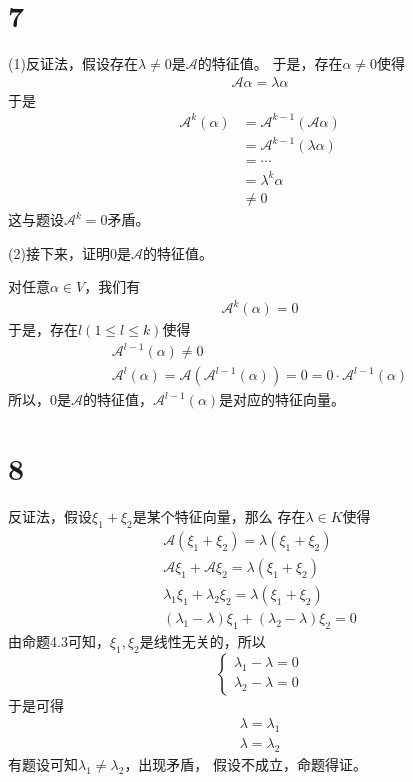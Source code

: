 \documentclass{article}
\begin{document}
\section*{7}

 (1)反证法，假设存在$\lambda \neq 0$是$\mathscr{A}$的特征值。
于是，存在$\alpha \neq 0$使得
\begin{align*}
  \mathscr{A} \alpha = \lambda \alpha
\end{align*}
于是
\begin{align*}
  \mathscr{A}^k (\alpha)
   & = \mathscr{A}^{k-1}(\mathscr{A} \alpha) \\
   & = \mathscr{A}^{k-1}(\lambda \alpha)     \\
   & = \cdots                                \\
   & = \lambda^k \alpha                      \\
   & \neq 0
\end{align*}
这与题设$\mathscr{A}^k = 0$矛盾。

(2)接下来，证明0是$\mathscr{A}$的特征值。

对任意$\alpha \in V$，我们有
\begin{align*}
  \mathscr{A}^k (\alpha) = 0
\end{align*}
于是，存在$l (1 \leq l \leq k)$使得
\begin{align*}
  \mathscr{A}^{l - 1}(\alpha) \neq 0 \\
  \mathscr{A}^l(\alpha) = \mathscr{A}(\mathscr{A}^{l - 1}(\alpha)) = 0 = 0 \cdot \mathscr{A}^{l - 1}(\alpha)
\end{align*}
所以，$0$是$\mathscr{A}$的特征值，$\mathscr{A}^{l - 1}(\alpha)$是对应的特征向量。

\section*{8}

反证法，假设$\xi_1 + \xi_2$是某个特征向量，那么
存在$\lambda \in K$使得
\begin{align*}
  \mathscr{A} (\xi_1 + \xi_2) = \lambda (\xi_1 + \xi_2)           \\
  \mathscr{A} \xi_1 + \mathscr{A} \xi_2 = \lambda (\xi_1 + \xi_2) \\
  \lambda_1 \xi_1 + \lambda_2 \xi_2 = \lambda (\xi_1 + \xi_2)     \\
  (\lambda_1 - \lambda) \xi_1 + (\lambda_2 - \lambda) \xi_2 = 0
\end{align*}
由命题4.3可知，$\xi_1, \xi_2$是线性无关的，所以
\begin{equation*}
  \begin{cases*}
    \lambda_1 - \lambda = 0 \\
    \lambda_2 - \lambda = 0
  \end{cases*}
\end{equation*}
于是可得
\begin{align*}
  \lambda = \lambda_1 \\
  \lambda = \lambda_2
\end{align*}
有题设可知$\lambda_1 \neq \lambda_2$，出现矛盾，
假设不成立，命题得证。
\end{document}
